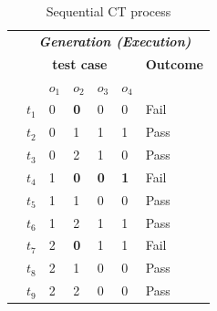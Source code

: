 \documentclass[10pt,journal,compsoc]{IEEEtran}
\begin{document}
\begin{table}[h]
\caption{ Sequential CT process}
\label{tradition-gi}
\centering
\begin{tabular}{lllllll}
                                       & \multicolumn{6}{c}{\bfseries \emph{Generation (Execution)}}                                                                                                                                                                                                                                  \\ \cline{2-7}
                                       & \multicolumn{5}{c|}{\bfseries test case}                                                                                                                                                                                                              & \bfseries Outcome \\
                                       & &$o_{1}$ & $o_{2}$& $o_{3}$& \multicolumn{1}{c|}{$o_{4}$}&  \\    \cline{2-7}
                                       & \multicolumn{1}{l|}{$t_{1}$}   & 0& \textbf{0}& 0& \multicolumn{1}{l|}{0}     & Fail              \\
                                       & \multicolumn{1}{l|}{$t_{2}$}   & 0& 1& 1& \multicolumn{1}{l|}{1}     & Pass              \\
                                       & \multicolumn{1}{l|}{$t_{3}$}   & 0& 2& 1& \multicolumn{1}{l|}{0}     & Pass              \\
                                       & \multicolumn{1}{l|}{$t_{4}$}   & 1& \textbf{0}& \textbf{0}& \multicolumn{1}{l|}{\textbf{1}}     & Fail              \\
                                       & \multicolumn{1}{l|}{$t_{5}$}   & 1& 1& 0& \multicolumn{1}{l|}{0}     & Pass              \\
                                       & \multicolumn{1}{l|}{$t_{6}$}   & 1& 2& 1& \multicolumn{1}{l|}{1}     & Pass              \\
                                       & \multicolumn{1}{l|}{$t_{7}$}   & 2& \textbf{0}& 1& \multicolumn{1}{l|}{1}     & Fail              \\
                                       & \multicolumn{1}{l|}{$t_{8}$}   & 2& 1& 0& \multicolumn{1}{l|}{0}     & Pass              \\
                                       & \multicolumn{1}{l|}{$t_{9}$}   & 2& 2& 0& \multicolumn{1}{l|}{0}     & Pass              \\ \cline{2-7}

\end{tabular}
\end{table}
\end{document}
